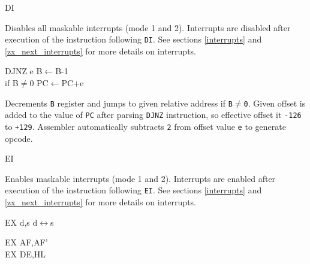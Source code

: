\documentclass[12pt,twoside,openright,a4paper]{book}
\begin{document}
\begin{basedescript}{
	\desclabelstyle{\multilinelabel}
	\desclabelwidth{3cm}}
	\begin{detailitem}{DI}
		{}

		Disables all maskable interrupts (mode 1 and 2). Interrupts are disabled after execution of the instruction following {\tt DI}. See sections \ref{interrupts} and \ref{zx_next_interrupts} for more details on interrupts.
		
		\DetailNoEffect
				
		\begin{DetailTiming}
		\end{DetailTiming}

	\end{detailitem}

	\begin{detailitem}{DJNZ e}
		{B$\leftarrow$B-1\\
		if B$\not=$0 PC$\leftarrow$PC+e}

		Decrements {\tt B} register and jumps to given relative address if {\tt B$\not=$0}. Given offset is added to the value of {\tt PC} after parsing {\tt DJNZ} instruction, so effective offset it {\tt -126} to {\tt +129}. Assembler automatically subtracts {\tt 2} from offset value {\tt e} to generate opcode.

		\DetailNoEffect
				
		\begin{DetailTiming}
			\DetailTime{B=0}{2}{8}
			\DetailTime{B$\not=$0}{3}{13}
		\end{DetailTiming}

	\end{detailitem}

	\pagebreak
	\begin{detailitem}{EI}
		{}

		Enables maskable interrupts (mode 1 and 2). Interrupts are enabled after execution of the instruction following {\tt EI}. See sections \ref{interrupts} and \ref{zx_next_interrupts} for more details on interrupts.

		\DetailNoEffect
				
		\begin{DetailTiming}
			\DetailTime{}{1}{4}
		\end{DetailTiming}

	\end{detailitem}

	\begin{detailitem}{EX d,s}
		{d$\leftrightarrow$s}

		\begin{DetailVariants}
			EX AF,AF'\\
			EX DE,HL


\end{DetailVariants}
\end{detailitem}
\end{basedescript}
\end{document}
